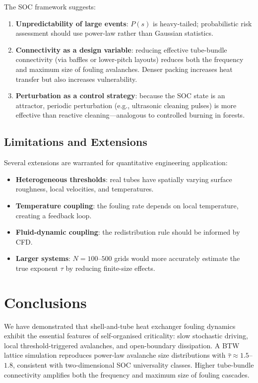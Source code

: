 \documentclass[10pt,a4paper,twocolumn]{article}
\begin{document}
The SOC framework suggests:
\begin{enumerate}
  \item \textbf{Unpredictability of large events}: $P(s)$ is heavy-tailed;
        probabilistic risk assessment should use power-law rather than
        Gaussian statistics.
  \item \textbf{Connectivity as a design variable}: reducing effective
        tube-bundle connectivity (via baffles or lower-pitch layouts) reduces
        both the frequency and maximum size of fouling avalanches. Denser
        packing increases heat transfer but also increases vulnerability.
  \item \textbf{Perturbation as a control strategy}: because the SOC state is
        an attractor, periodic perturbation (e.g., ultrasonic cleaning
        pulses) is more effective than reactive cleaning---analogous to
        controlled burning in forests.
\end{enumerate}

\subsection{Limitations and Extensions}

Several extensions are warranted for quantitative engineering application:
\begin{itemize}
  \item \textbf{Heterogeneous thresholds}: real tubes have spatially varying
        surface roughness, local velocities, and temperatures.
  \item \textbf{Temperature coupling}: the fouling rate depends on local
        temperature, creating a feedback loop.
  \item \textbf{Fluid-dynamic coupling}: the redistribution rule should be
        informed by CFD.
  \item \textbf{Larger systems}: $N=100$--$500$ grids would more accurately
        estimate the true exponent $\tau$ by reducing finite-size effects.
\end{itemize}

\section{Conclusions}
\label{sec:conclusions}

We have demonstrated that shell-and-tube heat exchanger fouling dynamics
exhibit the essential features of self-organised criticality: slow stochastic
driving, local threshold-triggered avalanches, and open-boundary dissipation.
A BTW lattice simulation reproduces power-law avalanche size distributions
with $\hat{\tau}\approx1.5$--$1.8$, consistent with two-dimensional SOC
universality classes. Higher tube-bundle connectivity amplifies both the
frequency and maximum size of fouling cascades.
\end{document}
